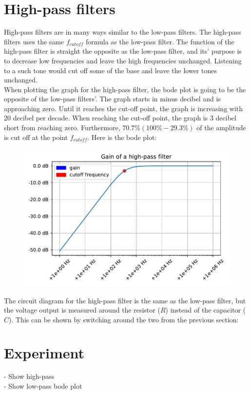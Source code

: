 \section{High-pass filters}
High-pass filters are in many ways similar to the low-pass filters. The high-pass filters uses the same $f_{cutoff}$ formula as the low-pass filter. The function of the high-pass filter is straight the opposite as the low-pass filter, and its' purpose is to decrease low frequencies and leave the high frequencies unchanged. Listening to a such tone would cut off some of the base and leave the lower tones unchanged. \\

When plotting the graph for the high-pass filter, the bode plot is going to be the opposite of the low-pass filters'. The graph starts in minus decibel and is approaching zero. Until it reaches the cut-off point, the graph is increasing with 20 decibel per decade. When reaching the cut-off point, the graph is 3 decibel short from reaching zero. Furthermore, $70.7\% (100\%-29.3\%)$ of the amplitude is cut off at the point $f_{cutoff}$. Here is the bode plot:
\begin{figure}[H]
\center
	\includegraphics[scale=0.7]{fig/img/bode_plot_HPF}
\end{figure}
The circuit diagram for the high-pass filter is the same as the low-pass filter, but the voltage output is measured around the resistor ($R$) instead of the capacitor ($C$). This can be shown by switching around the two from the previous section:
\begin{figure}[H]
	
\end{figure}

\section{Experiment}
- Show high-pass \\
- Show low-pass bode plot